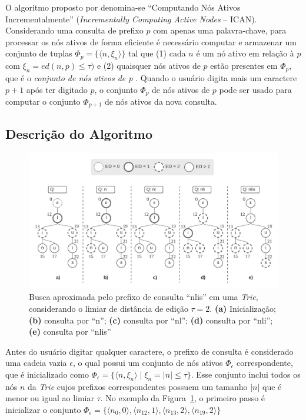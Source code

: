 O algoritmo proposto por \cite{ji2009efficient} denomina-se ``Computando Nós Ativos Incrementalmente'' (\textit{Incrementally Computing Active Nodes } -- ICAN). Considerando uma consulta de prefixo $p$ com apenas uma palavra-chave, para processar os nós ativos de forma eficiente é necessário computar e armazenar um conjunto de tuplas $\Phi_{p} = \{ \langle n, \xi_{n} \rangle \}$ tal que (1) cada $n$ é um nó ativo em relação à $p$ com $\xi_{n} = ed(n, p) \leq \tau)$ e (2) quaisquer nós ativos de $p$ estão presentes em $\Phi_{p}$, que é o \textit{conjunto de nós ativos de p} \citep{ji2009efficient}. Quando o usuário digita mais um caractere $p + 1$ após ter digitado $p$, o conjunto $\Phi_{p}$ de nós ativos de $p$ pode ser usado para computar o conjunto $\Phi_{p + 1}$ de nós ativos da nova consulta.

\subsection{Descrição do Algoritmo}

\begin{figure}[ht]
    \centering
    \includegraphics[width=1\textwidth]{figures/ican_example.png}
    \caption{Busca aproximada pelo prefixo de consulta ``nlis'' em uma \textit{Trie}, considerando o limiar de distância de edição $\tau = 2$. \textbf{(a)} Inicialização; \textbf{(b)} consulta por ``n''; \textbf{(c)} consulta por ``nl''; \textbf{(d)} consulta por ``nli''; \textbf{(e)} consulta por ``nlis'' }
    \label{fig:ican_example}
\end{figure}

Antes do usuário digitar qualquer caractere, o prefixo de consulta é considerado uma cadeia vazia $\epsilon$, o qual possui um conjunto de nós ativos $\Phi_{\epsilon}$ correspondente, que é inicializado como $\Phi_{\epsilon} = \{\langle n, \xi_{n} \rangle \mid \xi_{n} = |n| \leq \tau\}$. Esse conjunto inclui todos os nós $n$ da \textit{Trie} cujos prefixos correspondentes possuem um tamanho $|n|$ que é menor ou igual ao limiar $\tau$. No exemplo da Figura~\ref{fig:ican_example}, o primeiro passo é inicializar o conjunto $\Phi_{\epsilon} = \{ \langle n_{0}, 0\rangle, \langle n_{12}, 1\rangle,  \langle n_{13}, 2\rangle,  \langle n_{19}, 2\rangle \}$

